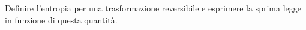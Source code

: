 \question  Definire l'entropia per una trasformazione reversibile e esprimere la sprima legge in funzione di questa quantità.

